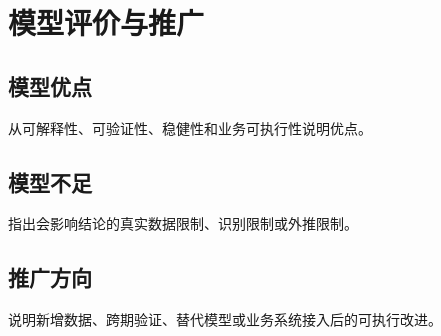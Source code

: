 \section{模型评价与推广}

\subsection{模型优点}
从可解释性、可验证性、稳健性和业务可执行性说明优点。

\subsection{模型不足}
指出会影响结论的真实数据限制、识别限制或外推限制。

\subsection{推广方向}
说明新增数据、跨期验证、替代模型或业务系统接入后的可执行改进。
